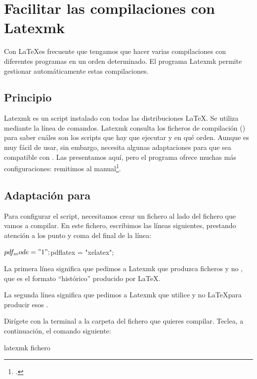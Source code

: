 \chapter{Facilitar las compilaciones con Latexmk}\label{latexmk}

\begin{intro}
Con \LaTeX es frecuente que tengamos que hacer varias compilaciones con diferentes programas en un orden determinado. El programa Latexmk permite gestionar automáticamente estas compilaciones.
\end{intro}

\section{Principio}

Latexmk es un script instalado con todas las distribuciones \LaTeX. Se utiliza mediante la línea de comandos.
Latexmk consulta los ficheros de compilación () para saber cuáles son los scripts que hay que ejecutar y en qué orden. 
Aunque es muy fácil de usar, sin embargo, necesita algunas adaptaciones para que sea compatible con \XeLaTeX. Las presentamos aquí, pero el programa ofrece muchas más configuraciones: remitimos al manual\footcite{latexmk}.

\section[Adaptación para XeLaTeX]{Adaptación para \XeLaTeX}

Para configurar el script, necesitamos crear un fichero  al lado del fichero que vamos a compilar. En este fichero, escribimos las líneas siguientes, prestando atención a los punto y coma del final de la línea:

\begin{bashcode}
$pdf_mode = "1";
$pdflatex = "xelatex";
\end{bashcode}

La primera línea significa que pedimos a Latexmk que produzca ficheros  y no , que es el formato \enquote{histórico} producido por \LaTeX.

La segunda línea significa que pedimos a Latexmk que utilice \XeLaTeX y no \LaTeX para producir esos .


Dirígete con la terminal a la carpeta del fichero que quieres compilar. Teclea, a continuación, el comando siguiente:
\begin{bashcode}
latexmk fichero
\end{bashcode}

